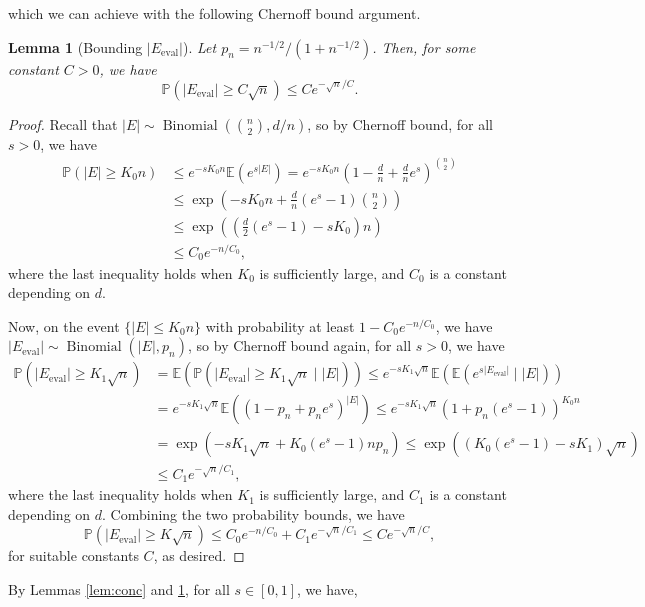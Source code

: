 \documentclass[11pt, titlepage]{article} %
\numberwithin{equation}{section}
\newtheorem{lemma}{Lemma}
\theoremstyle{definition}
\numberwithin{theorem}{section}
\numberwithin{lemma}{section}
\numberwithin{corollary}{section}
\numberwithin{proposition}{section}
\numberwithin{definition}{section}
\numberwithin{remark}{section}
\begin{document}
which we can achieve with the following Chernoff bound argument.
\begin{lemma}[Bounding $|E_\mathrm{eval}|$]
\label{lem:eval.size}
Let $p_n = n^{-1/2}/(1 + n^{-1/2})$. Then, for some constant $C > 0$, we have
\[
\mathbb{P}(|E_\mathrm{eval}| \geq C \sqrt{n}) \leq Ce^{-\sqrt{n}/C}.
\]
\end{lemma}
\begin{proof}
Recall that $|E| \sim \operatorname{Binomial}\left(\binom{n}{2}, d/n\right)$, so by Chernoff bound, for all $s > 0$, we have
\begin{align*}
  \mathbb{P}(|E| \geq K_0 n) & \leq e^{-s K_0 n} \mathbb{E}(e^{s|E|}) 
  = e^{-sK_0 n} \left(1 - \frac{d}{n} + \frac{d}{n} e^{s}\right)^{\binom{n}{2}}\\
  & \leq \exp\left(-s K_0 n + \frac{d}{n} (e^{s} - 1) \binom{n}{2}\right)\\
  & \leq \exp\left(\left(\frac{d}{2} (e^{s} - 1) - sK_0\right) n\right)\\
  & \leq C_0e^{-n/C_0},
\end{align*}
where the last inequality holds when $K_0$ is sufficiently large, and $C_0$ is a constant depending on $d$.

Now, on the event $\{|E| \leq K_0 n\}$ with probability at least $1 - C_0e^{-n/C_0}$, 
we have $|E_\mathrm{eval}| \sim \operatorname{Binomial}\left(|E|, p_n\right)$,
so by Chernoff bound again, for all $s > 0$, we have
\begin{align*}
  \mathbb{P}(|E_\mathrm{eval}| \geq K_1 \sqrt{n})
  & = \mathbb{E} \left(\mathbb{P}(|E_\mathrm{eval}| \geq K_1 \sqrt{n} \mid |E|)\right)
  \leq e^{-sK_1\sqrt{n}} \mathbb{E}(\mathbb{E}(e^{s|E_\mathrm{eval}|} \mid |E|))\\
  & = e^{-sK_1\sqrt{n}} \mathbb{E}(\left(1 - p_n + p_n e^s\right)^{|E|})
  \leq e^{-sK_1\sqrt{n}} \left(1 + p_n (e^s - 1)\right)^{K_0 n}\\
  & = \exp\left(-sK_1\sqrt{n} + K_0 (e^s - 1) n p_n \right)
  \leq \exp\left((K_0 (e^s - 1) - sK_1) \sqrt{n}\right)\\
  & \leq C_1e^{-\sqrt{n}/C_1},
\end{align*}
where the last inequality holds when $K_1$ is sufficiently large, and $C_1$ is a constant depending on $d$.
Combining the two probability bounds, we have
\[
\mathbb{P}(|E_\mathrm{eval}| \geq K \sqrt{n}) \leq C_0e^{-n/C_0} + C_1e^{-\sqrt{n}/C_1} \leq Ce^{-\sqrt{n}/C},
\]
for suitable constants $C$, as desired.
\end{proof}
By Lemmas \ref{lem:conc} and \ref{lem:eval.size}, for all $s \in [0,1]$, we have,
\end{document}
